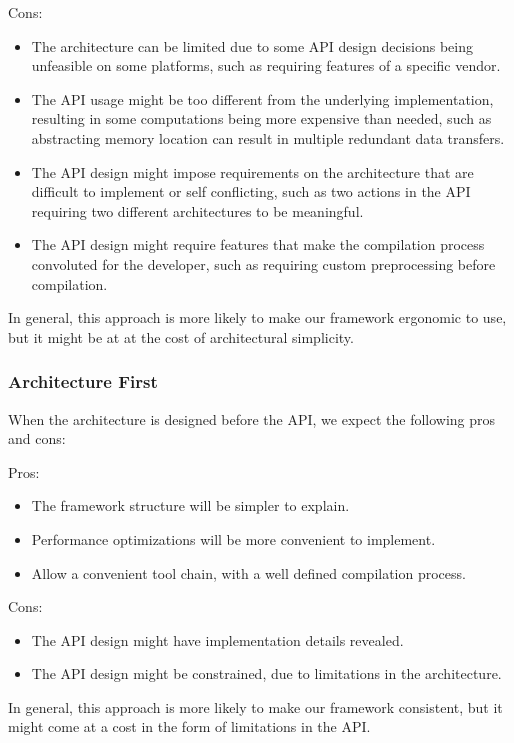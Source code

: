 Cons:
\begin{itemize}
\item The architecture can be limited due to some API design decisions being unfeasible on some platforms, such as requiring features of a specific vendor.
\item The API usage might be too different from the underlying implementation, resulting in some computations being more expensive than needed, such as abstracting memory location can result in multiple redundant data transfers.
\item The API design might impose requirements on the architecture that are difficult to implement or self conflicting, such as two actions in the API requiring two different architectures to be meaningful.
\item The API design might require features that make the compilation process convoluted for the developer, such as requiring custom preprocessing before compilation.
\end{itemize}

In general, this approach is more likely to make our framework ergonomic to use, but it might be at at the cost of architectural simplicity. 

\subsubsection{Architecture First}
When the architecture is designed before the API, we expect the following pros and cons:

Pros:
\begin{itemize}
\item The framework structure will be simpler to explain.
\item Performance optimizations will be more convenient to implement.
\item Allow a convenient tool chain, with a well defined compilation process.
\end{itemize}

Cons:
\begin{itemize}
\item The API design might have implementation details revealed.
\item The API design might be constrained, due to limitations in the architecture.
\end{itemize}

In general, this approach is more likely to make our framework consistent, but it might come at a cost in the form of limitations in the API. 

